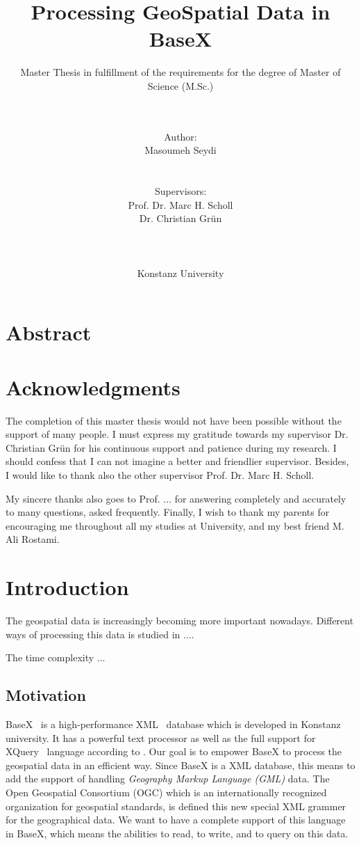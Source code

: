 \documentclass[a4paper,12pt]{article}
\title{Processing GeoSpatial Data in BaseX}
\subtitle{Master Thesis in fulfillment of the requirements for the degree of
Master of Science (M.Sc.)}
\author{\\\\Author: \\
	Masoumeh Seydi
	\\\\\\Supervisors: \\
	Prof. Dr. Marc H. Scholl \\ 
	Dr. Christian Gr{\"u}n \\
	\\\\\\
	Konstanz University}
\begin{document}
\maketitle
\thispagestyle{empty}

\newpage
\section*{Abstract}

\thispagestyle{empty}

\newpage
\section*{Acknowledgments}
\thispagestyle{empty}

The completion of this master thesis would not have been possible 
without the support of many people. 
I must express my gratitude towards my supervisor 
Dr. Christian Gr{\"u}n for his continuous support and patience during my research.
I should confess that I can not imagine a better and friendlier
supervisor. Besides, I would like to thank also the other supervisor
Prof. Dr. Marc H. Scholl.

My sincere thanks also goes to Prof. ...  for
answering completely and accurately to many questions, asked
frequently. Finally, I wish to thank my parents for encouraging me 
throughout all my studies at University, and my best friend M. Ali Rostami.


\newpage
\tableofcontents

\thispagestyle{empty}
\newpage
\section{Introduction}
\setcounter{page}{1}
The geospatial data is increasingly becoming more important nowadays.
Different ways of processing this data is studied in ....

The time complexity ...

\subsection{Motivation}
BaseX~\cite{www/basex} is a high-performance XML~\cite{www/xml}
 database which is developed in Konstanz university.
It has a powerful text processor as well as the full support 
for XQuery~\cite{www/xquery,www/xqueryfun} language according to \cite{conf/xsym/GrunGHS09}.
Our goal is to empower BaseX to process the geospatial data in an efficient way.
Since BaseX is a XML database, this means to add the support of handling 
\emph{Geography Markup Language (GML)} data. The Open Geospatial Consortium (OGC)
which is an internationally recognized organization for geospatial standards,
is defined this new special XML grammer for the geographical data.
We want to have a complete support of this language in BaseX,
which means the abilities to read, to write, and to query on this data.
\end{document}

